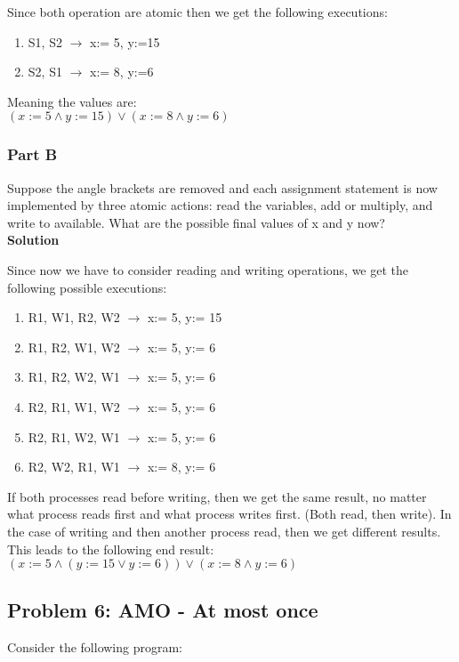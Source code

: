 Since both operation are atomic then we get the following executions: 
\begin{enumerate}
    \item S1, S2 $\to$ x:= 5, y:=15
    \item S2, S1 $\to$ x:= 8, y:=6
\end{enumerate}

Meaning the values are: \\
$(x:=5 \land y:=15) \lor (x:=8 \land y:=6)$


\subsubsection{Part B}

Suppose the angle brackets are removed and each assignment statement is now implemented by three atomic actions: 
read the variables, add or multiply, and write to available. What are the possible final values of x and y now? \\

\textbf{Solution} 

Since now we have to consider reading and writing operations, we get the following possible executions: 
\begin{enumerate}
    \item R1, W1, R2, W2 $\to$ x:= 5, y:= 15 
    \item R1, R2, W1, W2 $\to$ x:= 5, y:= 6 
    \item R1, R2, W2, W1 $\to$ x:= 5, y:= 6
    \item R2, R1, W1, W2 $\to$ x:= 5, y:= 6
    \item R2, R1, W2, W1 $\to$ x:= 5, y:= 6 
    \item R2, W2, R1, W1 $\to$ x:= 8, y:= 6 
\end{enumerate}

If both processes read before writing, then we get the same result, no matter what process reads first and what process writes first.
(Both read, then write). In the case of writing and then another process read, then we get different results. This leads to the following end result: \\
$(x := 5 \land (y:= 15 \lor y:= 6)) \lor (x:= 8 \land y:= 6)$


\subsection{Problem 6: AMO - At most once}

Consider the following program: 

